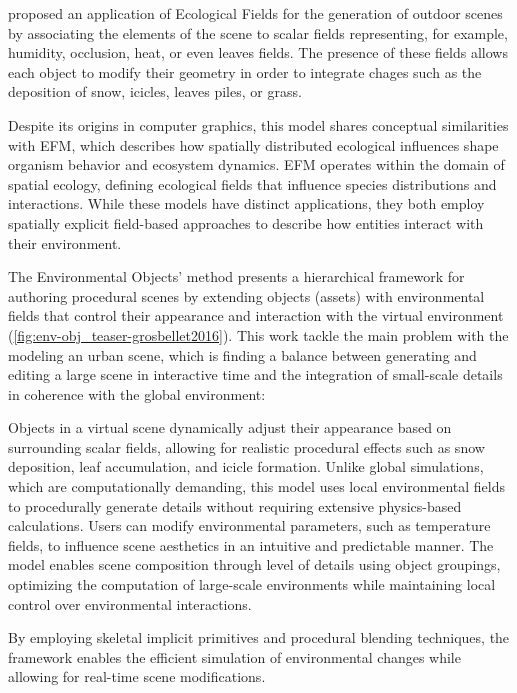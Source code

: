\citep{Grosbellet2016} proposed an application of Ecological Fields for the generation of outdoor scenes by associating the elements of the scene to scalar fields representing, for example, humidity, occlusion, heat, or even leaves fields. The presence of these fields allows each object to modify their geometry in order to integrate chages such as the deposition of snow, icicles, leaves piles, or grass. 

Despite its origins in computer graphics, this model shares conceptual similarities with EFM, which describes how spatially distributed ecological influences shape organism behavior and ecosystem dynamics. EFM operates within the domain of spatial ecology, defining ecological fields that influence species distributions and interactions. While these models have distinct applications, they both employ spatially explicit field-based approaches to describe how entities interact with their environment.


The Environmental Objects' method presents a hierarchical framework for authoring procedural scenes by extending objects (assets) with environmental fields that control their appearance and interaction with the virtual environment (\cref{fig:env-obj_teaser-grosbellet2016}). This work tackle the main problem with the modeling an urban scene, which is finding a balance between generating and editing a large scene in interactive time and the integration of small-scale details in coherence with the global environment: 
\begin{Itemize}
    \Item{} Objects in a virtual scene dynamically adjust their appearance based on surrounding scalar fields, allowing for realistic procedural effects such as snow deposition, leaf accumulation, and icicle formation. Unlike global simulations, which are computationally demanding, this model uses local environmental fields to procedurally generate details without requiring extensive physics-based calculations.
    \Item{} Users can modify environmental parameters, such as temperature fields, to influence scene aesthetics in an intuitive and predictable manner. The model enables scene composition through level of details using object groupings, optimizing the computation of large-scale environments while maintaining local control over environmental interactions.
\end{Itemize}
By employing skeletal implicit primitives and procedural blending techniques, the framework enables the efficient simulation of environmental changes while allowing for real-time scene modifications. 

